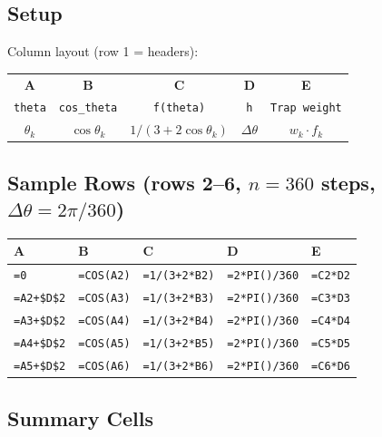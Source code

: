 \documentclass[12pt,a4paper]{article}
\begin{document}
\subsection*{Setup}

Column layout (row 1 = headers):

\begin{center}
\begin{tabular}{@{}ccccc@{}}
\toprule
\textbf{A} & \textbf{B} & \textbf{C} & \textbf{D} & \textbf{E} \\
\texttt{theta} & \texttt{cos\_theta} & \texttt{f(theta)} & \texttt{h} & \texttt{Trap weight} \\
\midrule
$\theta_k$ & $\cos\theta_k$ & $1/(3+2\cos\theta_k)$ & $\Delta\theta$ & $w_k \cdot f_k$ \\
\bottomrule
\end{tabular}
\end{center}

\subsection*{Sample Rows (rows 2--6, $n = 360$ steps, $\Delta\theta = 2\pi/360$)}

\begin{center}
\begin{tabular}{@{}lllll@{}}
\toprule
\textbf{A} & \textbf{B} & \textbf{C} & \textbf{D} & \textbf{E} \\
\midrule
\texttt{=0} & \texttt{=COS(A2)} & \texttt{=1/(3+2*B2)} & \texttt{=2*PI()/360} & \texttt{=C2*D2} \\
\texttt{=A2+\$D\$2} & \texttt{=COS(A3)} & \texttt{=1/(3+2*B3)} & \texttt{=2*PI()/360} & \texttt{=C3*D3} \\
\texttt{=A3+\$D\$2} & \texttt{=COS(A4)} & \texttt{=1/(3+2*B4)} & \texttt{=2*PI()/360} & \texttt{=C4*D4} \\
\texttt{=A4+\$D\$2} & \texttt{=COS(A5)} & \texttt{=1/(3+2*B5)} & \texttt{=2*PI()/360} & \texttt{=C5*D5} \\
\texttt{=A5+\$D\$2} & \texttt{=COS(A6)} & \texttt{=1/(3+2*B6)} & \texttt{=2*PI()/360} & \texttt{=C6*D6} \\
\bottomrule
\end{tabular}
\end{center}

\subsection*{Summary Cells}
\end{document}
